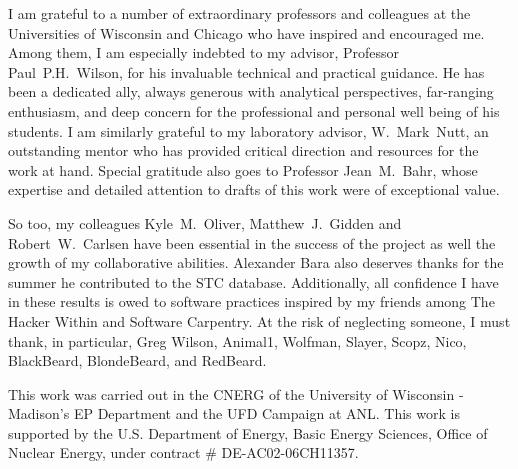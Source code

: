 I am grateful to a number of extraordinary professors and colleagues at the 
Universities of Wisconsin and Chicago who have inspired and encouraged me.  
Among them, I am especially indebted to my advisor, Professor Paul~P.H.~Wilson, 
for his invaluable technical and practical guidance. He has been a dedicated 
ally, always generous with analytical perspectives, far-ranging enthusiasm, and 
deep concern for the professional and personal well being of his students. I 
am similarly grateful to my laboratory advisor, W.~Mark~Nutt, an outstanding 
mentor who has provided critical direction and resources for the work at 
hand. Special gratitude also goes to Professor Jean~M.~Bahr, whose expertise 
and detailed attention to drafts of this work were of exceptional value.  

So too, my colleagues Kyle~M.~Oliver, Matthew~J.~Gidden and Robert~W.~Carlsen 
have been essential in the success of the \Cyclus project as well the growth of 
my collaborative abilities. Alexander Bara also deserves thanks for the summer 
he contributed to the STC database. Additionally, all confidence I have in 
these results is owed to software practices inspired by my friends among The 
Hacker Within and Software Carpentry. At the risk of neglecting someone, I must 
thank, in particular, Greg Wilson, Animal1, Wolfman, Slayer, Scopz, Nico,  
BlackBeard, BlondeBeard, and RedBeard.

This work was carried out in the \gls{CNERG} of the University of Wisconsin - 
Madison's \gls{EP} Department and the \gls{UFD} Campaign at \gls{ANL}. This 
work is supported by the U.S. Department of Energy, Basic Energy Sciences, 
Office of Nuclear Energy, under contract \# DE-AC02-06CH11357.
